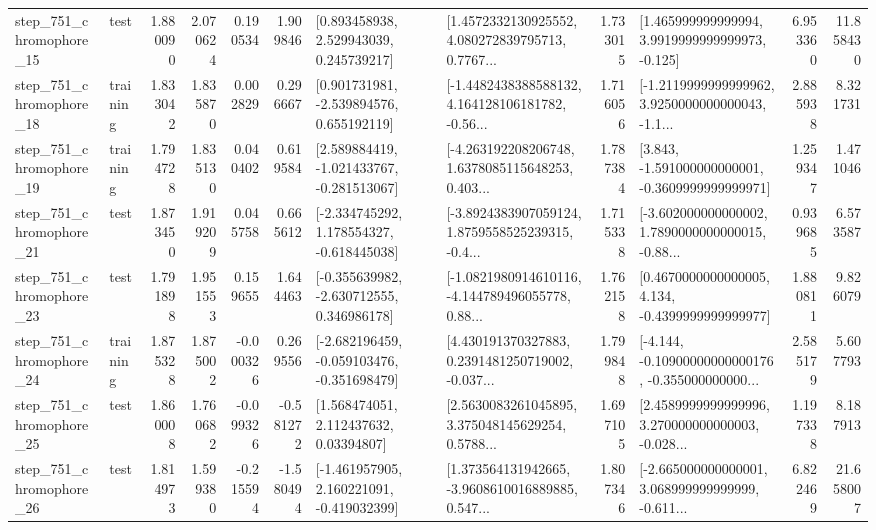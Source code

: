 \begin{tabular}{llrrrrllrlrr}
  step\_751\_chromophore\_15 &      test &      1.880090 &    2.070624 &      0.190534 &  1.909846 &     [0.893458938, 2.529943039, 0.245739217] &  [1.4572332130925552, 4.080272839795713, 0.7767... &       1.733015 &    [1.465999999999994, 3.9919999999999973, -0.125] &            6.953360 &         11.858430 \\
  step\_751\_chromophore\_18 &  training &      1.833042 &    1.835870 &      0.002829 &  0.296667 &    [0.901731981, -2.539894576, 0.655192119] &  [-1.4482438388588132, 4.164128106181782, -0.56... &       1.716056 &  [-1.2119999999999962, 3.9250000000000043, -1.1... &            2.885938 &          8.321731 \\
  step\_751\_chromophore\_19 &  training &      1.794728 &    1.835130 &      0.040402 &  0.619584 &   [2.589884419, -1.021433767, -0.281513067] &  [-4.263192208206748, 1.6378085115648253, 0.403... &       1.787384 &   [3.843, -1.591000000000001, -0.3609999999999971] &            1.259347 &          1.471046 \\
  step\_751\_chromophore\_21 &      test &      1.873450 &    1.919209 &      0.045758 &  0.665612 &   [-2.334745292, 1.178554327, -0.618445038] &  [-3.8924383907059124, 1.8759558525239315, -0.4... &       1.715338 &  [-3.602000000000002, 1.7890000000000015, -0.88... &            0.939685 &          6.573587 \\
  step\_751\_chromophore\_23 &      test &      1.791898 &    1.951553 &      0.159655 &  1.644463 &   [-0.355639982, -2.630712555, 0.346986178] &  [-1.0821980914610116, -4.144789496055778, 0.88... &       1.762158 &   [0.4670000000000005, 4.134, -0.4399999999999977] &            1.880811 &          9.826079 \\
  step\_751\_chromophore\_24 &  training &      1.875328 &    1.875002 &     -0.000326 &  0.269556 &  [-2.682196459, -0.059103476, -0.351698479] &  [4.430191370327883, 0.2391481250719002, -0.037... &       1.799848 &  [-4.144, -0.10900000000000176, -0.355000000000... &            2.585179 &          5.607793 \\
  step\_751\_chromophore\_25 &      test &      1.860008 &    1.760682 &     -0.099326 & -0.581272 &      [1.568474051, 2.112437632, 0.03394807] &  [2.5630083261045895, 3.375048145629254, 0.5788... &       1.697105 &  [2.4589999999999996, 3.270000000000003, -0.028... &            1.197338 &          8.187913 \\
  step\_751\_chromophore\_26 &      test &      1.814973 &    1.599380 &     -0.215594 & -1.580494 &   [-1.461957905, 2.160221091, -0.419032399] &  [1.373564131942665, -3.9608610016889885, 0.547... &       1.807346 &  [-2.665000000000001, 3.068999999999999, -0.611... &            6.822469 &         21.658007 \\

\end{tabular}
